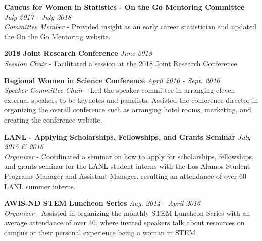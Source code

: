 \outreachspace
\textbf{Caucus for Women in Statistics - On the Go Mentoring Committee} \hfill \textit{July 2017 - July 2018}\\
\textit{Committee Member} - Provided insight as an early career statistician and updated the On the Go Mentoring website.

\outreachspace
\textbf{2018 Joint Research Conference} \hfill \textit{June 2018}\\
\textit{Session Chair} - Facilitated a session at the 2018 Joint Research Conference.

\outreachspace
\textbf{Regional Women in Science Conference} \hfill \textit{April 2016 - Sept. 2016}\\
\textit{Speaker Committee Chair} - Led the speaker committee in arranging eleven external speakers to be keynotes and panelists; Assisted the conference director in organizing the overall conference such as arranging hotel rooms, marketing, and creating the conference website.

\outreachspace
\textbf{LANL - Applying Scholarships, Fellowships, and Grants Seminar} \hfill \textit{July 2015 \& 2016}\\
\textit{Organizer} - Coordinated a seminar on how to apply for scholarships, fellowships, and grants seminar for the LANL student interns with the Los Alamos Student Programs Manager and Assistant Manager, resulting an attendance of over 60 LANL summer interns.

\outreachspace
\textbf{AWIS-ND STEM Luncheon Series} \hfill \textit{Aug. 2014 - April 2016}\\
\textit{Organizer} - Assisted in organizing the monthly STEM Luncheon Series with an average attendance of over 40, where invited speakers talk about resources on campus or their personal experience being a woman in STEM
